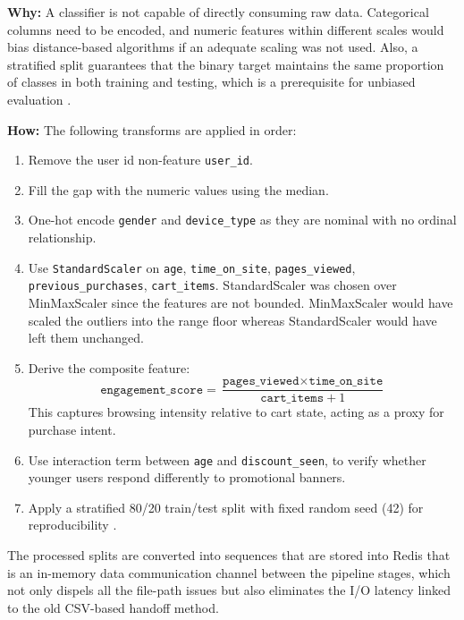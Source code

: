 \documentclass[12pt,a4paper]{article}
\begin{document}
\textbf{Why:} A classifier is not capable of directly consuming raw data. Categorical columns need to be encoded, and numeric features within different scales would bias distance-based algorithms if an adequate scaling was not used. Also, a stratified split guarantees that the binary target maintains the
same proportion of classes in both training and testing, which is a prerequisite for unbiased evaluation \cite{pedregosa2011}. 

\textbf{How:} The following transforms are applied in order:

\begin{enumerate}[leftmargin=*, label=\arabic*., itemsep=2pt]
  \item Remove the user id non-feature \texttt{user\_id}.
  \item Fill the gap with the numeric values using the median.
  \item One-hot encode \texttt{gender} and \texttt{device\_type} as they are nominal with no ordinal relationship. 
  \item Use \texttt{StandardScaler} on \texttt{age}, \texttt{time\_on\_site}, \texttt{pages\_viewed},
    \texttt{previous\_purchases}, \texttt{cart\_items}. StandardScaler was chosen over MinMaxScaler since the features
are not bounded. MinMaxScaler would have scaled the outliers into the
range floor whereas StandardScaler would have left them unchanged. 
  \item Derive the composite feature:
    \begin{equation}
      \texttt{engagement\_score} = \frac{\texttt{pages\_viewed} \times \texttt{time\_on\_site}}{\texttt{cart\_items} + 1}
    \end{equation}
    This captures browsing intensity relative to cart state, acting as a proxy for purchase intent.
  \item Use interaction term between \texttt{age} and \texttt{discount\_seen}, to verify
    whether younger users respond differently to promotional banners.
  \item Apply a stratified 80/20 train/test split with fixed random seed (42) for reproducibility \cite{sklearn2018}.
\end{enumerate}

The processed splits are converted into sequences that are stored into Redis that is an in-memory data communication channel between the
pipeline stages, which not only dispels all the file-path issues but also eliminates the I/O latency linked to the old CSV-based handoff method.
\end{document}
